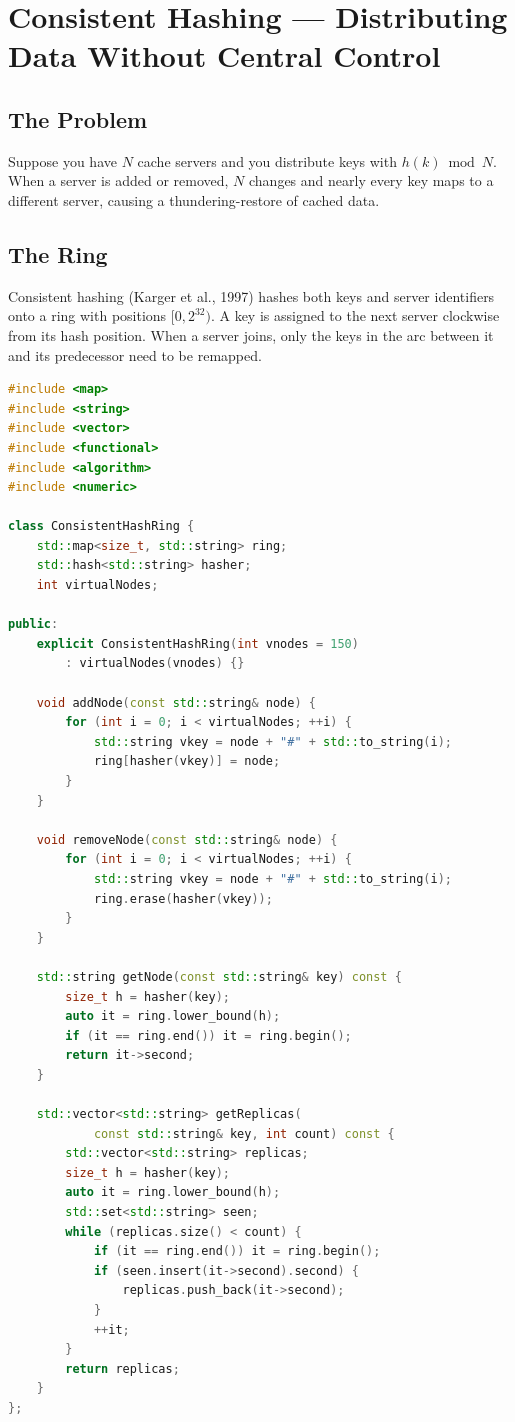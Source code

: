 \section{Consistent Hashing --- Distributing Data Without Central Control}

\subsection{The Problem}

Suppose you have $N$ cache servers and you distribute keys with $h(k) \bmod N$.
When a server is added or removed, $N$ changes and nearly every key maps to a
different server, causing a thundering-restore of cached data.

\subsection{The Ring}

Consistent hashing (Karger et al., 1997) hashes both keys and server identifiers
onto a ring with positions $[0, 2^{32})$.  A key is assigned to the next server
clockwise from its hash position.  When a server joins, only the keys in the arc
between it and its predecessor need to be remapped.

\begin{lstlisting}[language=C++]
#include <map>
#include <string>
#include <vector>
#include <functional>
#include <algorithm>
#include <numeric>

class ConsistentHashRing {
    std::map<size_t, std::string> ring;
    std::hash<std::string> hasher;
    int virtualNodes;

public:
    explicit ConsistentHashRing(int vnodes = 150)
        : virtualNodes(vnodes) {}

    void addNode(const std::string& node) {
        for (int i = 0; i < virtualNodes; ++i) {
            std::string vkey = node + "#" + std::to_string(i);
            ring[hasher(vkey)] = node;
        }
    }

    void removeNode(const std::string& node) {
        for (int i = 0; i < virtualNodes; ++i) {
            std::string vkey = node + "#" + std::to_string(i);
            ring.erase(hasher(vkey));
        }
    }

    std::string getNode(const std::string& key) const {
        size_t h = hasher(key);
        auto it = ring.lower_bound(h);
        if (it == ring.end()) it = ring.begin();
        return it->second;
    }

    std::vector<std::string> getReplicas(
            const std::string& key, int count) const {
        std::vector<std::string> replicas;
        size_t h = hasher(key);
        auto it = ring.lower_bound(h);
        std::set<std::string> seen;
        while (replicas.size() < count) {
            if (it == ring.end()) it = ring.begin();
            if (seen.insert(it->second).second) {
                replicas.push_back(it->second);
            }
            ++it;
        }
        return replicas;
    }
};
\end{lstlisting}

